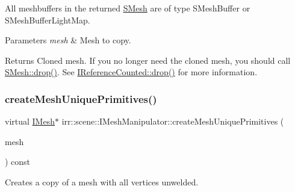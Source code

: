 All meshbuffers in the returned \hyperlink{structirr_1_1scene_1_1SMesh}{S\+Mesh} are of type S\+Mesh\+Buffer or S\+Mesh\+Buffer\+Light\+Map. 
\begin{DoxyParams}{Parameters}
{\em mesh} & Mesh to copy. \\
\hline
\end{DoxyParams}
\begin{DoxyReturn}{Returns}
Cloned mesh. If you no longer need the cloned mesh, you should call \hyperlink{classirr_1_1IReferenceCounted_a03856a09355b89d178090c4a5f738543}{S\+Mesh\+::drop()}. See \hyperlink{classirr_1_1IReferenceCounted_a03856a09355b89d178090c4a5f738543}{I\+Reference\+Counted\+::drop()} for more information. 
\end{DoxyReturn}
\mbox{\label{classirr_1_1scene_1_1IMeshManipulator_a73051bc082f128a2e0592fb1a3da2b7d}} 
\subsubsection{\texorpdfstring{create\+Mesh\+Unique\+Primitives()}{createMeshUniquePrimitives()}\hspace{0.1cm}{\footnotesize\ttfamily [1/2]}}
{\footnotesize\ttfamily virtual \hyperlink{classirr_1_1scene_1_1IMesh}{I\+Mesh}$\ast$ irr\+::scene\+::\+I\+Mesh\+Manipulator\+::create\+Mesh\+Unique\+Primitives (\begin{DoxyParamCaption}\item[{\hyperlink{classirr_1_1scene_1_1IMesh}{I\+Mesh} $\ast$}]{mesh }\end{DoxyParamCaption}) const\hspace{0.3cm}{\ttfamily [pure virtual]}}



Creates a copy of a mesh with all vertices unwelded. 


